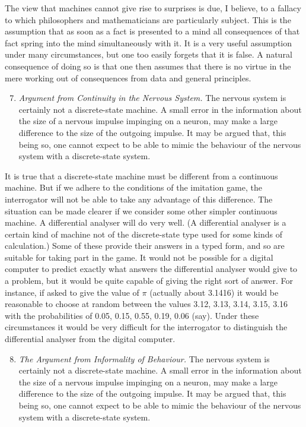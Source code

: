     The view that machines cannot give rise to surprises is due, I believe, to a fallacy to which philosophers and mathematicians are particularly subject. This is the assumption that as soon as a fact is presented to a mind all consequences of that fact spring into the mind simultaneously with it. It is a very useful assumption under many circumstances, but one too easily forgets that it is false. A natural consequence of doing so is that one then assumes that there is no virtue in the mere working out of consequences from data and general principles.

    \begin{enumerate}[label=(\arabic*)]
        \setcounter{enumi}{6}
        \item{\textit{Argument from Continuity in the Nervous System.} The nervous system is certainly not a discrete-state machine. A small error in the information about the size of a nervous impulse impinging on a neuron, may make a large difference to the size of the outgoing impulse. It may be argued that, this being so, one cannot expect to be able to mimic the behaviour of the nervous system with a discrete-state system.}
    \end{enumerate}

    It is true that a discrete-state machine must be different from a continuous machine. But if we adhere to the conditions of the imitation game, the interrogator will not be able to take any advantage of this difference. The situation can be made clearer if we consider some other simpler continuous machine. A differential analyser will do very well. (A differential analyser is a certain kind of machine not of the discrete-state type used for some kinds of calculation.) Some of these provide their answers in a typed form, and so are suitable for taking part in the game. It would not be possible for a digital computer to predict exactly what answers the differential analyser would give to a problem, but it would be quite capable of giving the right sort of answer. For instance, if asked to give the value of $\pi$ (actually about 3.1416) it would be reasonable to choose at random between the values 3.12, 3.13, 3.14, 3.15, 3.16 with the probabilities of 0.05, 0.15, 0.55, 0.19, 0.06 (say). Under these circumstances it would be very difficult for the interrogator to distinguish the differential analyser from the digital computer.

    \begin{enumerate}[label=(\arabic*)]
        \setcounter{enumi}{7}
        \item{\textit{The Argument from Informality of Behaviour.} The nervous system is certainly not a discrete-state machine. A small error in the information about the size of a nervous impulse impinging on a neuron, may make a large difference to the size of the outgoing impulse. It may be argued that, this being so, one cannot expect to be able to mimic the behaviour of the nervous system with a discrete-state system.}
    \end{enumerate}


